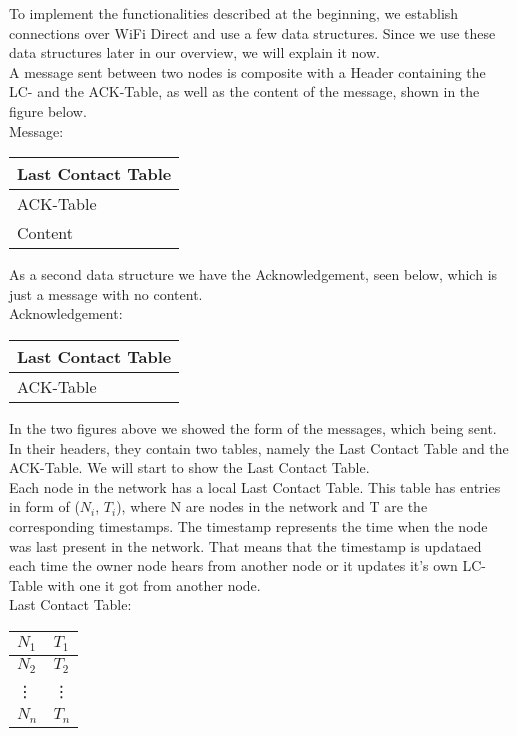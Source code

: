 	To implement the functionalities described at the beginning, we establish connections over WiFi Direct and use a few data structures. Since we use these data structures later in our overview, we will explain it now. \\

	A message sent between two nodes is composite with a Header containing the LC- and the ACK-Table, as well as the content of the message, shown in the figure below. \\

	Message:
		\begin{center}
			\begin{tabular}{ | l |}
				\hline
				Last Contact Table \\ \hline
				ACK-Table \\ \hline
				Content \\ \hline
			\end{tabular}
		\end{center}


As a second data structure we have the Acknowledgement, seen below, which is just a message with no content. \\


	Acknowledgement:
		\begin{center}
			\begin{tabular}{ | l |}
				\hline
				Last Contact Table \\ \hline
				ACK-Table \\ \hline
			\end{tabular}
		\end{center}
			
In the two figures above we showed the form of the messages, which being sent. In their headers, they contain two tables, namely the Last Contact Table and the ACK-Table. We will start to show the Last Contact Table. \\

Each node in the network has a local Last Contact Table. This table has entries in form of ($N_{i}$, $T_{i}$), where N are nodes in the network and T are the corresponding timestamps. The timestamp represents the time when the node was last present in the network. That means that the timestamp is updataed each time the owner node hears from another node or it updates it's own LC-Table with one it got from another node. \\

	Last Contact Table:
		\begin{center}
			\begin{tabular}{ | l | l |}
				\hline
				$N_{1}$ & $T_{1}$ \\ \hline
				$N_{2}$ & $T_{2}$ \\ \hline
				\vdots & \vdots \\ \hline
				$N_{n}$ & $T_{n}$ \\ 
				\hline
			\end{tabular}
		\end{center}
			

